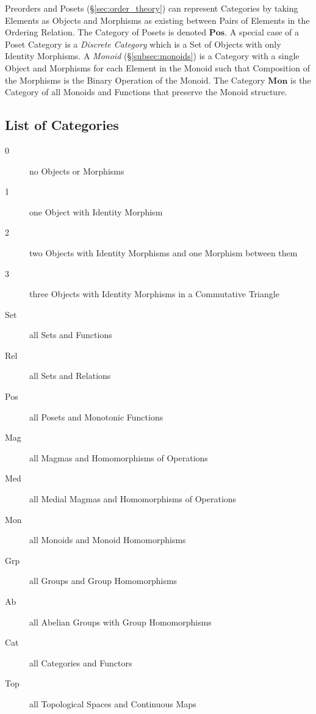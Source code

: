 \documentclass{article}
\begin{document}
Preorders and Posets (\S\ref{sec:order_theory}) can
represent Categories by taking Elements as Objects and Morphisms as
existing between Pairs of Elements in the Ordering Relation. The
Category of Posets is denoted $\mathbf{Pos}$. A special case of a
Poset Category is a \emph{Discrete Category} which is a Set of Objects
with only Identity Morphisms. A \emph{Monoid} (\S\ref{subsec:monoids})
is a Category with a single Object and Morphisms for each Element in
the Monoid such that Composition of the Morphisms is the Binary
Operation of the Monoid. The Category $\mathbf{Mon}$ is the Category
of all Monoids and Functions that preserve the Monoid structure.

\subsection{List of Categories}\label{subsec:categories_list}

\begin{description}
\item [0] no Objects or Morphisms
\item [1] one Object with Identity Morphism
\item [2] two Objects with Identity Morphisms and one Morphism between
  them
\item [3] three Objects with Identity Morphisms in a Commutative
  Triangle
\item [Set] all Sets and Functions
\item [Rel] all Sets and Relations
\item [Pos] all Posets and Monotonic Functions
\item [Mag] all Magmas and Homomorphisms of Operations
\item [Med] all Medial Magmas and Homomorphisms of Operations
\item [Mon] all Monoids and Monoid Homomorphisms
\item [Grp] all Groups and Group Homomorphisms
\item [Ab] all Abelian Groups with Group Homomorphisms
\item [Cat] all Categories and Functors
\item [Top] all Topological Spaces and Continuous Maps
\end{description}

\end{document}
